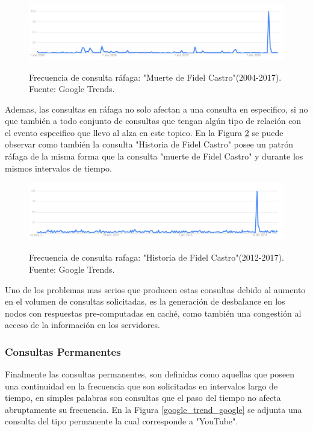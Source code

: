 \documentclass[12pt]{ociamthesis}  %
\begin{document}
\begin{figure}[!htb]
	\centering
	\includegraphics[width=15cm]{muerte_fidel_castro.png}\\
	\caption{Frecuencia de consulta ráfaga: "Muerte de Fidel Castro"(2004-2017). Fuente: Google Trends.}
	\label{google_trend_muerte_Fidel_Cast}
\end{figure}

Ademas, las consultas en ráfaga no solo afectan a una consulta en especifico, si no que también a todo conjunto de consultas que tengan algún tipo de relación con el evento especifico que llevo al alza en este topico. En la Figura \ref{google_trend_histo_Fidel_Cas} se puede observar como también la consulta "Historia de Fidel Castro" posee un patrón ráfaga de la misma forma que la consulta "muerte de Fidel Castro" y durante los mismos intervalos de tiempo.\\

\begin{figure}[!htb]
	\centering
	\includegraphics[width=15cm]{historia_Fidel_Castro.png}\\
	\caption{Frecuencia de consulta rafaga: "Historia de Fidel Castro"(2012-2017). Fuente: Google Trends.}
	\label{google_trend_histo_Fidel_Cas}
\end{figure}

Uno de los problemas mas serios que producen estas consultas debido al aumento en el volumen de consultas solicitadas, es la generación de desbalance en los nodos con respuestas pre-computadas en caché, como también una congestión al acceso de la información en los servidores.\\

\subsubsection{Consultas Permanentes}
Finalmente las consultas permanentes, son definidas como aquellas que poseen una continuidad en la frecuencia que son solicitadas en intervalos largo de tiempo, en simples palabras son consultas que el paso del tiempo no afecta abruptamente su frecuencia. En la Figura \ref{google_trend_google} se adjunta una consulta del tipo permanente la cual corresponde a "YouTube".\\
\end{document}
